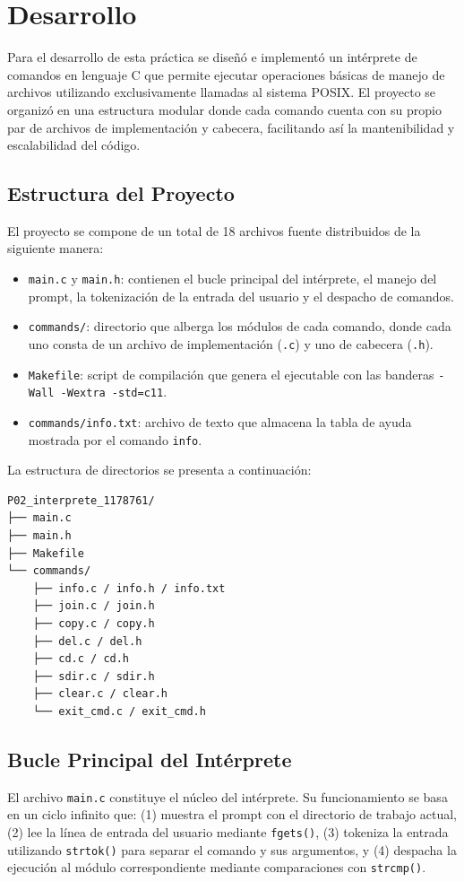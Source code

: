 \newpage
\section{Desarrollo}
    Para el desarrollo de esta práctica se diseñó e implementó un intérprete de comandos en lenguaje C que permite ejecutar operaciones básicas de manejo de archivos utilizando exclusivamente llamadas al sistema POSIX. El proyecto se organizó en una estructura modular donde cada comando cuenta con su propio par de archivos de implementación y cabecera, facilitando así la mantenibilidad y escalabilidad del código.

    \subsection{Estructura del Proyecto}
        El proyecto se compone de un total de 18 archivos fuente distribuidos de la siguiente manera:

        \begin{itemize}
            \item \texttt{main.c} y \texttt{main.h}: contienen el bucle principal del intérprete, el manejo del prompt, la tokenización de la entrada del usuario y el despacho de comandos.
            \item \texttt{commands/}: directorio que alberga los módulos de cada comando, donde cada uno consta de un archivo de implementación (\texttt{.c}) y uno de cabecera (\texttt{.h}).
            \item \texttt{Makefile}: script de compilación que genera el ejecutable con las banderas \texttt{-Wall -Wextra -std=c11}.
            \item \texttt{commands/info.txt}: archivo de texto que almacena la tabla de ayuda mostrada por el comando \texttt{info}.
        \end{itemize}

        La estructura de directorios se presenta a continuación:
        \begin{verbatim}
P02_interprete_1178761/
├── main.c
├── main.h
├── Makefile
└── commands/
    ├── info.c / info.h / info.txt
    ├── join.c / join.h
    ├── copy.c / copy.h
    ├── del.c / del.h
    ├── cd.c / cd.h
    ├── sdir.c / sdir.h
    ├── clear.c / clear.h
    └── exit_cmd.c / exit_cmd.h
        \end{verbatim}

    \subsection{Bucle Principal del Intérprete}
        El archivo \texttt{main.c} constituye el núcleo del intérprete. Su funcionamiento se basa en un ciclo infinito que: (1) muestra el prompt con el directorio de trabajo actual, (2) lee la línea de entrada del usuario mediante \texttt{fgets()}, (3) tokeniza la entrada utilizando \texttt{strtok()} para separar el comando y sus argumentos, y (4) despacha la ejecución al módulo correspondiente mediante comparaciones con \texttt{strcmp()}.

